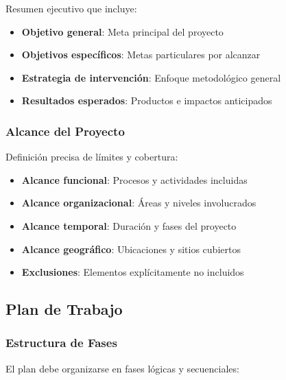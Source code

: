 \documentclass[12pt,letterpaper,oneside]{book}
\begin{document}
Resumen ejecutivo que incluye:

\begin{itemize}
\item \textbf{Objetivo general}: Meta principal del proyecto
\item \textbf{Objetivos específicos}: Metas particulares por alcanzar
\item \textbf{Estrategia de intervención}: Enfoque metodológico general
\item \textbf{Resultados esperados}: Productos e impactos anticipados
\end{itemize}

\subsubsection{Alcance del Proyecto}

Definición precisa de límites y cobertura:

\begin{itemize}
\item \textbf{Alcance funcional}: Procesos y actividades incluidas
\item \textbf{Alcance organizacional}: Áreas y niveles involucrados
\item \textbf{Alcance temporal}: Duración y fases del proyecto
\item \textbf{Alcance geográfico}: Ubicaciones y sitios cubiertos
\item \textbf{Exclusiones}: Elementos explícitamente no incluidos
\end{itemize}

\subsection{Plan de Trabajo}

\subsubsection{Estructura de Fases}

El plan debe organizarse en fases lógicas y secuenciales:
\end{document}
